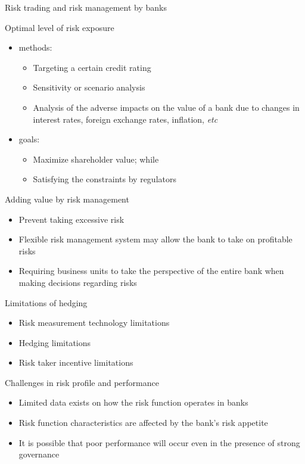 \begin{frame}[allowframebreaks]{Risk trading and risk management by banks}

\begin{block}{Optimal level of risk exposure}
	\begin{itemize}
		\item methods:
		\begin{itemize}
			\item Targeting a certain credit rating
			\item Sensitivity or scenario analysis
			\item Analysis of the adverse impacts on the value of
			a bank due to changes in interest rates, foreign exchange rates, inflation, \textit{etc}
		\end{itemize}
		\item goals:
		\begin{itemize}
			\item Maximize shareholder value; while
			\item Satisfying the constraints by regulators
		\end{itemize}
	\end{itemize}
\end{block}

\begin{block}{Adding value by risk management}
	\begin{itemize}
		\item Prevent taking excessive risk
		\item Flexible risk management system may allow the bank to take on profitable risks
		\item Requiring business units to take
		the perspective of the entire bank when making decisions regarding risks
	\end{itemize}
\end{block}

\begin{block}{Limitations of hedging}
	\begin{itemize}
		\item Risk measurement technology limitations
		\item Hedging limitations
		\item Risk taker incentive limitations
	\end{itemize}
\end{block}

\begin{block}{Challenges in risk profile and performance}
	\begin{itemize}
		\item Limited data exists on how the risk function operates in banks
		\item Risk function characteristics are affected by the
		bank's risk appetite
		\item It is possible that poor performance will occur even in the presence of strong governance
	\end{itemize}
\end{block}

\end{frame}

